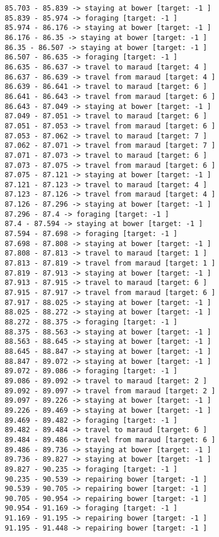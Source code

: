 \documentclass[11pt]{article}
\begin{document}
\begin{Verbatim}[commandchars=\\\{\}]
85.703 - 85.839 -> staying at bower [target: -1 ]
85.839 - 85.974 -> foraging [target: -1 ]
85.974 - 86.176 -> staying at bower [target: -1 ]
86.176 - 86.35 -> staying at bower [target: -1 ]
86.35 - 86.507 -> staying at bower [target: -1 ]
86.507 - 86.635 -> foraging [target: -1 ]
86.635 - 86.637 -> travel to maraud [target: 4 ]
86.637 - 86.639 -> travel from maraud [target: 4 ]
86.639 - 86.641 -> travel to maraud [target: 6 ]
86.641 - 86.643 -> travel from maraud [target: 6 ]
86.643 - 87.049 -> staying at bower [target: -1 ]
87.049 - 87.051 -> travel to maraud [target: 6 ]
87.051 - 87.053 -> travel from maraud [target: 6 ]
87.053 - 87.062 -> travel to maraud [target: 7 ]
87.062 - 87.071 -> travel from maraud [target: 7 ]
87.071 - 87.073 -> travel to maraud [target: 6 ]
87.073 - 87.075 -> travel from maraud [target: 6 ]
87.075 - 87.121 -> staying at bower [target: -1 ]
87.121 - 87.123 -> travel to maraud [target: 4 ]
87.123 - 87.126 -> travel from maraud [target: 4 ]
87.126 - 87.296 -> staying at bower [target: -1 ]
87.296 - 87.4 -> foraging [target: -1 ]
87.4 - 87.594 -> staying at bower [target: -1 ]
87.594 - 87.698 -> foraging [target: -1 ]
87.698 - 87.808 -> staying at bower [target: -1 ]
87.808 - 87.813 -> travel to maraud [target: 1 ]
87.813 - 87.819 -> travel from maraud [target: 1 ]
87.819 - 87.913 -> staying at bower [target: -1 ]
87.913 - 87.915 -> travel to maraud [target: 6 ]
87.915 - 87.917 -> travel from maraud [target: 6 ]
87.917 - 88.025 -> staying at bower [target: -1 ]
88.025 - 88.272 -> staying at bower [target: -1 ]
88.272 - 88.375 -> foraging [target: -1 ]
88.375 - 88.563 -> staying at bower [target: -1 ]
88.563 - 88.645 -> staying at bower [target: -1 ]
88.645 - 88.847 -> staying at bower [target: -1 ]
88.847 - 89.072 -> staying at bower [target: -1 ]
89.072 - 89.086 -> foraging [target: -1 ]
89.086 - 89.092 -> travel to maraud [target: 2 ]
89.092 - 89.097 -> travel from maraud [target: 2 ]
89.097 - 89.226 -> staying at bower [target: -1 ]
89.226 - 89.469 -> staying at bower [target: -1 ]
89.469 - 89.482 -> foraging [target: -1 ]
89.482 - 89.484 -> travel to maraud [target: 6 ]
89.484 - 89.486 -> travel from maraud [target: 6 ]
89.486 - 89.736 -> staying at bower [target: -1 ]
89.736 - 89.827 -> staying at bower [target: -1 ]
89.827 - 90.235 -> foraging [target: -1 ]
90.235 - 90.539 -> repairing bower [target: -1 ]
90.539 - 90.705 -> repairing bower [target: -1 ]
90.705 - 90.954 -> repairing bower [target: -1 ]
90.954 - 91.169 -> foraging [target: -1 ]
91.169 - 91.195 -> repairing bower [target: -1 ]
91.195 - 91.448 -> repairing bower [target: -1 ]

\end{Verbatim}
\end{document}
